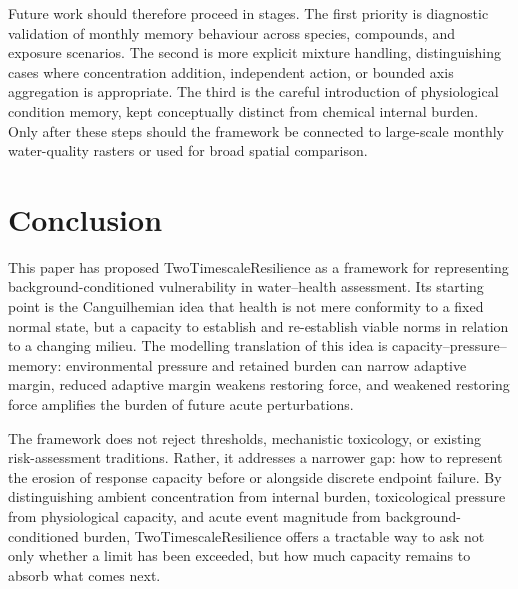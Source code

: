 Future work should therefore proceed in stages. The first priority is diagnostic validation of monthly memory behaviour across species, compounds, and exposure scenarios. The second is more explicit mixture handling, distinguishing cases where concentration addition, independent action, or bounded axis aggregation is appropriate. The third is the careful introduction of physiological condition memory, kept conceptually distinct from chemical internal burden. Only after these steps should the framework be connected to large-scale monthly water-quality rasters or used for broad spatial comparison.

\section{Conclusion}
\label{sec:conclusion}

This paper has proposed TwoTimescaleResilience as a framework for representing background-conditioned vulnerability in water--health assessment. Its starting point is the Canguilhemian idea that health is not mere conformity to a fixed normal state, but a capacity to establish and re-establish viable norms in relation to a changing milieu. The modelling translation of this idea is capacity--pressure--memory: environmental pressure and retained burden can narrow adaptive margin, reduced adaptive margin weakens restoring force, and weakened restoring force amplifies the burden of future acute perturbations.

The framework does not reject thresholds, mechanistic toxicology, or existing risk-assessment traditions. Rather, it addresses a narrower gap: how to represent the erosion of response capacity before or alongside discrete endpoint failure. By distinguishing ambient concentration from internal burden, toxicological pressure from physiological capacity, and acute event magnitude from background-conditioned burden, TwoTimescaleResilience offers a tractable way to ask not only whether a limit has been exceeded, but how much capacity remains to absorb what comes next.





